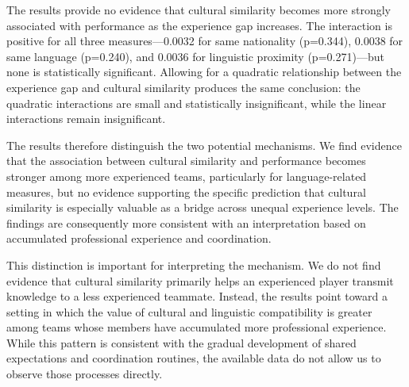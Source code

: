 \documentclass[10pt]{article}
\begin{document}
The results provide no evidence that cultural similarity becomes more strongly associated with performance as the experience gap increases. The interaction is positive for all three measures—0.0032 for same nationality (p=0.344), 0.0038 for same language (p=0.240), and 0.0036 for linguistic proximity (p=0.271)—but none is statistically significant. Allowing for a quadratic relationship between the experience gap and cultural similarity produces the same conclusion: the quadratic interactions are small and statistically insignificant, while the linear interactions remain insignificant.

The results therefore distinguish the two potential mechanisms. We find evidence that the association between cultural similarity and performance becomes stronger among more experienced teams, particularly for language-related measures, but no evidence supporting the specific prediction that cultural similarity is especially valuable as a bridge across unequal experience levels. The findings are consequently more consistent with an interpretation based on accumulated professional experience and coordination.

This distinction is important for interpreting the mechanism. We do not find evidence that cultural similarity primarily helps an experienced player transmit knowledge to a less experienced teammate. Instead, the results point toward a setting in which the value of cultural and linguistic compatibility is greater among teams whose members have accumulated more professional experience. While this pattern is consistent with the gradual development of shared expectations and coordination routines, the available data do not allow us to observe those processes directly.
\end{document}
